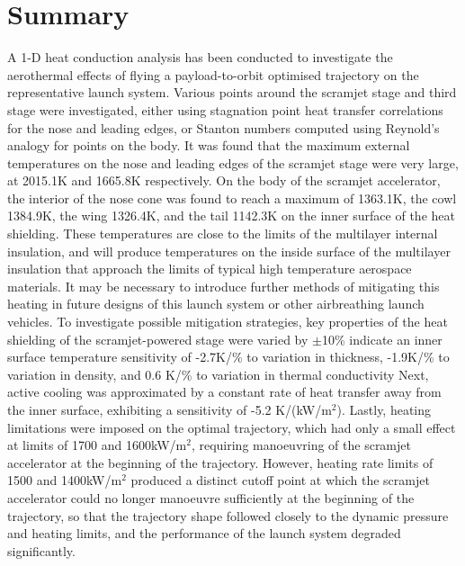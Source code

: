 %
%
%
%
%
%
%
%
%
%
%
%
%
%
%
%
%


\section{Summary}

A 1-D heat conduction analysis has been conducted to investigate the aerothermal effects of flying a payload-to-orbit optimised trajectory on the representative launch system. Various points around the scramjet stage and third stage were investigated, either using stagnation point heat transfer correlations for the nose and leading edges, or Stanton numbers computed using Reynold's analogy for points on the body. It was found that the maximum external temperatures on the nose and leading edges of the scramjet stage were very large, at 2015.1K and 1665.8K respectively. On the body of the scramjet accelerator, the interior of the nose cone was found to reach a maximum of 1363.1K, the cowl 1384.9K, the wing 1326.4K, and the tail 1142.3K on the inner surface of the heat shielding. These temperatures are close to the limits of the multilayer internal insulation, and will produce temperatures on the inside surface of the multilayer insulation that approach the limits of typical high temperature aerospace materials. It may be necessary to introduce further methods of mitigating this heating in future designs of this launch system or other airbreathing launch vehicles. To investigate possible mitigation strategies, key properties of the heat shielding of the scramjet-powered stage were varied by $\pm$10\% indicate an inner surface temperature sensitivity of -2.7K/\% to variation in thickness, -1.9K/\% to variation in density, and 0.6 K/\% to variation in thermal conductivity 
Next, active cooling was approximated by a constant rate of heat transfer away from the inner surface, exhibiting a sensitivity of -5.2 K/(kW/m$^2$). Lastly, heating limitations were imposed on the optimal trajectory, which had only a small effect at limits of 1700 and 1600kW/m$^2$, requiring manoeuvring of the scramjet accelerator at the beginning of the trajectory. However, heating rate limits of 1500 and 1400kW/m$^2$ produced a distinct cutoff point at which the scramjet accelerator could no longer manoeuvre sufficiently at the beginning of the trajectory, so that the trajectory shape followed closely to the dynamic pressure and heating limits, and the performance of the launch system degraded significantly. 


